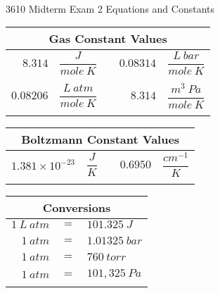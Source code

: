 \documentclass[12pt, letterpaper]{memoir}
\begin{document}
\newpage
\pagestyle{empty}

~
\vspace{-3em}
\begin{center}
	{\LARGE 3610 Midterm Exam 2 Equations and Constants}
\end{center}

\vspace{-1em}
\begin{minipage}{0.57\linewidth}
	\begin{mdframed}
		\begin{tabular}{rlcrl}
			\multicolumn{5}{c}{Gas Constant Values}                                       \\ \midrule
			$8.314$   & $\dfrac{J}{mole~K}$     &  & $0.08314$ & $\dfrac{L~bar}{mole~K}$  \\ \\
			$0.08206$ & $\dfrac{L~atm}{mole~K}$ &  & $8.314$   & $\dfrac{m^3~Pa}{mole~K}$ \\ \\
		\end{tabular}
		\begin{tabular}{rlcrl}
			\multicolumn{5}{c}{Boltzmann Constant Values}                                 \\ \midrule
			$1.381 \times 10^{-23}$ & $\dfrac{J}{K}$ &  & $0.6950$ & $\dfrac{cm^{-1}}{K}$ \\ \\
		\end{tabular}
	\end{mdframed}
\end{minipage}
\hspace{20pt}
\begin{minipage}{0.4\linewidth}
	\begin{mdframed}
		\begin{tabular}{rcl}
			\multicolumn{3}{c}{Conversions}  \\ \midrule
			$1~L~atm $ & $=$ & $101.325~J$   \\ \\
			$1~atm $   & $=$ & $1.01325~bar$ \\ \\
			$1~atm $   & $=$ & $760~torr$    \\ \\
			$1~atm $   & $=$ & $101,325~Pa$  \\ \\
		\end{tabular}
	\end{mdframed}
\end{minipage}
\end{document}
